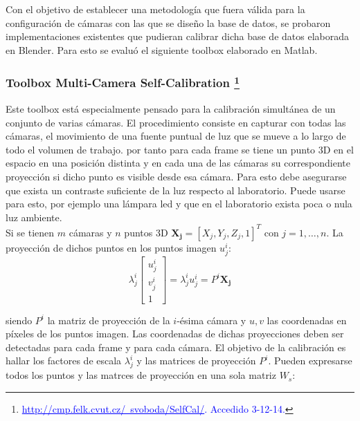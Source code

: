  Con el objetivo de establecer una metodología que fuera válida para la configuración de cámaras con las que se diseño la base de datos, se probaron implementaciones existentes que pudieran calibrar dicha base de datos elaborada en Blender. Para esto se evaluó el siguiente toolbox elaborado en Matlab.\\ 
 
  \subsubsection{Toolbox Multi-Camera Self-Calibration \footnote{\textcolor{blue}{\underline{http://cmp.felk.cvut.cz/~svoboda/SelfCal/}. Accedido 3-12-14.}}}
 
 Este toolbox está especialmente pensado para la calibración simultánea de un conjunto de varias cámaras. El procedimiento consiste en capturar con todas las cámaras, el movimiento de una fuente puntual de luz que se mueve a lo largo de todo el volumen de trabajo. por tanto para cada frame se tiene un punto 3D en el espacio en una posición distinta y en cada una de las cámaras su correspondiente proyección si dicho punto es visible desde esa cámara. Para esto debe asegurarse que exista un contraste suficiente de la luz respecto al laboratorio. Puede usarse para esto, por ejemplo una lámpara led y que en el laboratorio exista poca o nula luz ambiente.\\
 
 
 Si se tienen $m$ cámaras y $n$ puntos 3D  
$\mathbf{X_j} = [X_j, Y_j, Z_j,1]^T$ con $j=1,\ldots,n$. La proyección de dichos puntos en los puntos imagen $u_j^i$:
\[ \lambda_j^i
\begin{bmatrix}
u_j^i \\
v_j^i \\
1
\end{bmatrix} 
 = \lambda_j^i u_j^i = P^i \mathbf{X_j}
\]

siendo $P^i$ la matriz de proyección de la $i$-ésima cámara y $u,v$ las coordenadas en píxeles de los puntos imagen. Las coordenadas de dichas proyecciones deben ser detectadas para cada frame y para cada cámara. El objetivo de la calibración es hallar los factores de escala $\lambda_j^i$ y las matrices de proyección $P^i$. Pueden expresarse todos los puntos y las matrces de proyección en una sola matriz $W_s$:

